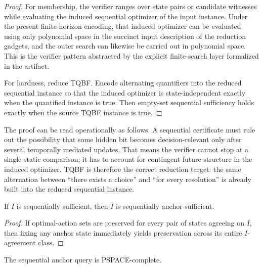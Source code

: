 
\begin{proof}
For membership, the verifier ranges over state pairs or candidate witnesses while evaluating the induced sequential optimizer of the input instance. Under the present finite-horizon encoding, that induced optimizer can be evaluated using only polynomial space in the succinct input description of the reduction gadgets, and the outer search can likewise be carried out in polynomial space. This is the verifier pattern abstracted by the explicit finite-search layer formalized in the artifact.

For hardness, reduce TQBF. Encode alternating quantifiers into the reduced sequential instance so that the induced optimizer is state-independent exactly when the quantified instance is true. Then empty-set sequential sufficiency holds exactly when the source TQBF instance is true.
\end{proof}

The proof can be read operationally as follows. A sequential certificate must rule out the possibility that some hidden bit becomes decision-relevant only after several temporally mediated updates. That means the verifier cannot stop at a single static comparison; it has to account for contingent future structure in the induced optimizer. TQBF is therefore the correct reduction target: the same alternation between ``there exists a choice'' and ``for every resolution'' is already built into the reduced sequential instance.

\begin{proposition}\label{prop:sequential-anchor-refinement}
If $I$ is sequentially sufficient, then $I$ is sequentially anchor-sufficient.
\end{proposition}


\begin{proof}
If optimal-action sets are preserved for every pair of states agreeing on $I$, then fixing any anchor state immediately yields preservation across its entire $I$-agreement class.
\end{proof}

\begin{theorem}\label{thm:sequential-anchor-hard}
The sequential anchor query is PSPACE-complete.
\end{theorem}

